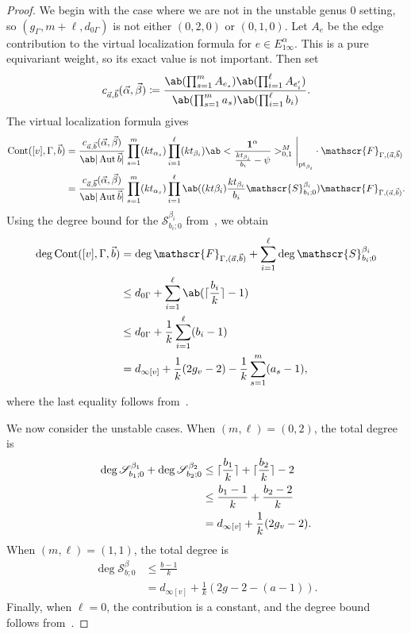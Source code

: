 \documentclass[10pt]{amsart}
\DeclarePairedDelimiter{\ceil}{\lceil}{\rceil}
\theoremstyle{definition}
\theoremstyle{remark}
\theoremstyle{plain}
\theoremstyle{definition}
\theoremstyle{remark}
\newcommand{\msc}[1]{\mathscr{#1}}
\newcommand{\mr}[1]{\mathrm{#1}}
\newcommand{\1}{\mathbf{1}}
\newcommand{\2}{\mathbf{2}}
\newcommand{\3}{\mathbf{3}}
\newcommand{\pt}{\mr{pt}}
\DeclareMathOperator{\Aut}{Aut}
\DeclareMathOperator{\Cont}{Cont}
\numberwithin{equation}{section}
\begin{document}
\begin{proof}
    We begin with the case where we are not in the unstable genus $0$ setting, so $(g_{\Gamma}, m+\ell, d_{0\Gamma})$ is not either $(0,2,0)$ or $(0,1,0)$. Let $A_e$ be the edge contribution to the virtual localization formula for $e \in E_{1\infty}^{\alpha}$. This is a pure equivariant weight, so its exact value is not important. Then set
    \[ c_{\vec{a}, \vec{b}}(\vec{\alpha}, \vec{\beta}) \coloneqq \frac{\ab(\prod_{s=1}^m A_{e_s}) \ab(\prod_{i=1}^{\ell} A_{e'_i})}{\ab(\prod_{s=1}^m a_s)\ab(\prod_{i=1}^{\ell} b_i)}. \]
    The virtual localization formula gives
    \begin{align*}
        \Cont([v], \Gamma, \vec{b}) ={}& \frac{c_{\vec{a}, \vec{b}}(\vec{\alpha}, \vec{\beta})}{\ab|\Aut \vec{b}|} \prod_{s=1}^m (k t_{\alpha_s}) \prod_{i=1}^{\ell}(kt_{\beta_i}) \ab<\frac{\1^{\alpha}}{\frac{kt_{\beta_i}}{b_i} - \psi}>_{0,1}^M \Bigg\vert_{\pt_{\beta_i}} \cdot 
        \msc{F}_{\Gamma, (\vec{a}, \vec{b})} \\
        ={}& \frac{c_{\vec{a}, \vec{b}}(\vec{\alpha}, \vec{\beta})}{\ab|\Aut \vec{b}|}\prod_{s=1}^m (k t_{\alpha_s}) \prod_{i=1}^{\ell} \ab((kt\beta_i)\frac{kt_{\beta_i}}{b_i} \msc{S}_{b_i;0}^{\beta_i})  
        \msc{F}_{\Gamma, (\vec{a}, \vec{b})}.
    \end{align*}
    Using the degree bound for the $\msc{S}_{b_i;0}^{\beta_i}$ from~, we obtain
    \begin{align*}
        \deg \Cont([v], \Gamma, \vec{b}) &= \deg \msc{F}_{\Gamma, (\vec{a}, \vec{b})} + \sum_{i=1}^{\ell} \deg \msc{S}_{b_i;0}^{\beta_i} \\
        &\leq d_{0\Gamma} + \sum_{i=1}^{\ell} \ab(\ceil{\frac{b_i}{k}}-1) \\
        &\leq d_{0\Gamma} + \frac{1}{k} \sum_{i=1}^{\ell} (b_i-1) \\
        &= d_{\infty[v]} + \frac{1}{k}(2g_v-2) - \frac{1}{k} \sum_{s=1}^m (a_s-1),
    \end{align*}
    where the last equality follows from~.

    We now consider the unstable cases. When $(m,\ell) = (0,2)$, the total degree is
    \begin{align*}
        \deg \msc{S}_{b_1;0}^{\beta_1} + \deg \msc{S}_{b_2;0}^{\beta_2} &\leq \ceil{\frac{b_1}{k}} + \ceil{\frac{b_2}{k}} - 2 \\
        &\leq \frac{b_1-1}{k} + \frac{b_2-2}{k} \\
        &= d_{\infty[v]} + \frac{1}{k}(2g_v-2).
    \end{align*}
    When $(m, \ell) = (1,1)$, the total degree is
    \begin{align*}
        \deg \msc{S}_{b;0}^{\beta} &\leq \frac{b-1}{k} \\
        &= d_{\infty[v]} + \frac{1}{k}(2g-2 - (a-1)).
    \end{align*}
    Finally, when $\ell = 0$, the contribution is a constant, and the degree bound follows from~.
\end{proof}
\end{document}
